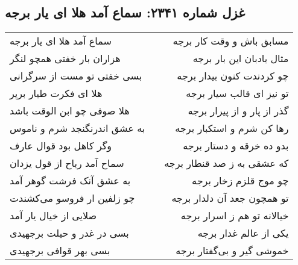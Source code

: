 \begin{center}
\section*{غزل شماره ۲۳۴۱: سماع آمد هلا ای یار برجه}
\label{sec:2341}
\begin{longtable}{l p{0.5cm} r}
سماع آمد هلا ای یار برجه
&&
مسابق باش و وقت کار برجه
\\
هزاران بار خفتی همچو لنگر
&&
مثال بادبان این بار برجه
\\
بسی خفتی تو مست از سرگرانی
&&
چو کردندت کنون بیدار برجه
\\
هلا ای فکرت طیار برپر
&&
تو نیز ای قالب سیار برجه
\\
هلا صوفی چو ابن الوقت باشد
&&
گذر از پار و از پیرار برجه
\\
به عشق اندرنگنجد شرم و ناموس
&&
رها کن شرم و استکبار برجه
\\
وگر کاهل بود قوال عارف
&&
بدو ده خرقه و دستار برجه
\\
سماح آمد رباح از قول یزدان
&&
که عشقی به ز صد قنطار برجه
\\
به عشق آنک فرشت گوهر آمد
&&
چو موج قلزم زخار برجه
\\
چو زلفین ار فروسو می‌کشندت
&&
تو همچون جعد آن دلدار برجه
\\
صلایی از خیال یار آمد
&&
خیالانه تو هم ز اسرار برجه
\\
بسی در غدر و حیلت برجهیدی
&&
یکی از عالم غدار برجه
\\
بسی بهر قوافی برجهیدی
&&
خموشی گیر و بی‌گفتار برجه
\\
\end{longtable}
\end{center}
